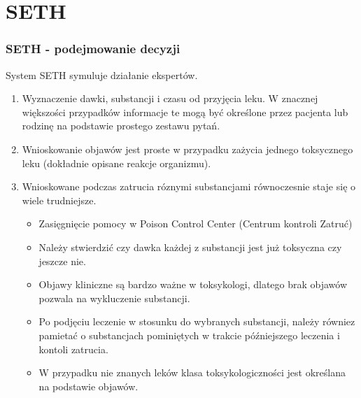 \section{SETH}


\begin{frame}[allowframebreaks]
\frametitle{SETH - podejmowanie decyzji}

System SETH symuluje działanie ekspertów.

\begin{enumerate}
    \item Wyznaczenie dawki, substancji i czasu od przyjęcia leku. W znacznej 
    większości przypadków informacje te mogą być określone przez pacjenta 
    lub rodzinę na podstawie prostego zestawu pytań.
    \item Wnioskowanie objawów jest proste w przypadku zażycia jednego
    toksycznego leku (dokładnie opisane reakcje organizmu).
\framebreak
    \item Wnioskowane podczas zatrucia róznymi substancjami równoczesnie staje
    się o wiele trudniejsze.
    \begin{itemize}
        \item Zasięgnięcie pomocy w Poison Control Center (Centrum kontroli
        Zatruć)
        \item Należy stwierdzić czy dawka każdej z substancji jest już
        toksyczna czy jeszcze nie.
        \item Objawy kliniczne są bardzo ważne w toksykologi, dlatego brak
        objawów pozwala na wykluczenie substancji.
        \item Po podjęciu leczenie w stosunku do wybranych substancji, należy
        równiez pamietać o substancjach pominiętych w trakcie późniejszego
        leczenia i kontoli zatrucia.
        \item W przypadku nie znanych leków klasa toksykologiczności jest
        określana na podstawie objawów.
    \end{itemize}

\end{enumerate}

\end{frame}


